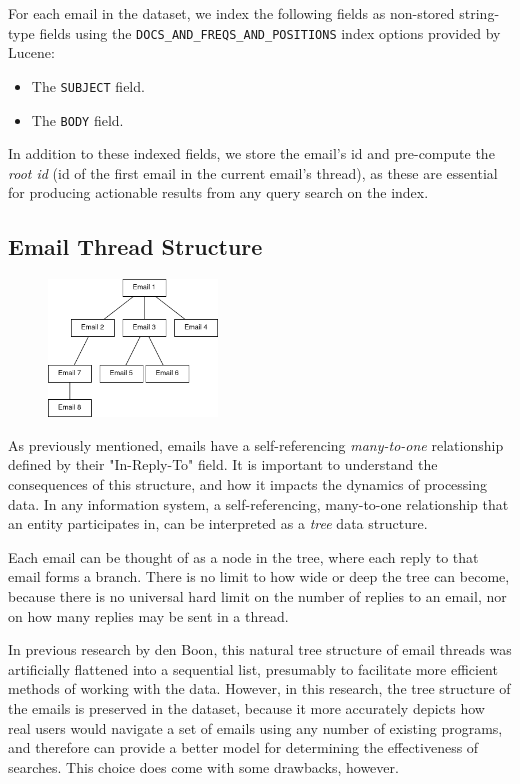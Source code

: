 \documentclass[a4paper, 12pt]{article}
\begin{document}
			For each email in the dataset, we index the following fields as non-stored string-type fields using the \texttt{DOCS\_AND\_FREQS\_AND\_POSITIONS} index options provided by Lucene\cite{apache-lucene}:
			\begin{itemize}
				\item The \texttt{SUBJECT} field.
				\item The \texttt{BODY} field.
			\end{itemize}
			In addition to these indexed fields, we store the email's id and pre-compute the \textit{root id} (id of the first email in the current email's thread), as these are essential for producing actionable results from any query search on the index.
			
	\subsection{Email Thread Structure}
		\begin{figure}
			\label{fig:email-threads}
			\includegraphics[width=0.4\textwidth]{img/email-threads.png}
		\end{figure}
	
		As previously mentioned, emails have a self-referencing \textit{many-to-one} relationship defined by their "In-Reply-To" field. It is important to understand the consequences of this structure, and how it impacts the dynamics of processing data. In any information system, a self-referencing, many-to-one relationship that an entity participates in, can be interpreted as a \textit{tree} data structure.
	
		Each email can be thought of as a node in the tree, where each reply to that email forms a branch. There is no limit to how wide or deep the tree can become, because there is no universal hard limit on the number of replies to an email, nor on how many replies may be sent in a thread.
		
		In previous research by den Boon, this natural tree structure of email threads was artificially flattened into a sequential list, presumably to facilitate more efficient methods of working with the data\cite{denboon}. However, in this research, the tree structure of the emails is preserved in the dataset, because it more accurately depicts how real users would navigate a set of emails using any number of existing programs, and therefore can provide a better model for determining the effectiveness of searches. This choice does come with some drawbacks, however.
		
\end{document}
